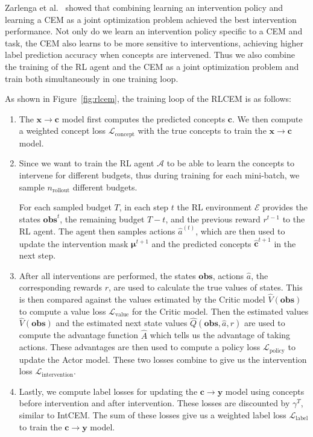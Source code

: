 Zarlenga et al.~\cite{intcem} showed that combining learning an intervention policy
and learning a CEM as a joint optimization problem achieved the best intervention performance.
Not only do we learn an intervention policy specific to a CEM and task, the 
CEM also learns to be more sensitive to interventions, achieving higher label prediction accuracy
when concepts are intervened. Thus we also combine the training of the RL agent and the CEM
as a joint optimization problem and train
both simultaneously in one training loop.

As shown in Figure~\ref{fig:rlcem}, the training loop
of the RLCEM is as follows:

\begin{enumerate}
    \item The $\mathbf{x} \to \mathbf{c}$ model first computes the predicted concepts $\mathbf{c}$.
    We then compute a weighted concept loss $\mathcal{L}_{\text{concept}}$ with the true concepts to train the $\mathbf{x} \to \mathbf{c}$ model.
    \item Since we want to train the RL agent $\mathcal{A}$ to be able to learn 
    the concepts to intervene for different budgets, thus during training 
    for each mini-batch, we sample $n_{\text{rollout}}$ different budgets.

    For each sampled budget $T$, 
    in each step $t$
    the RL environment $\mathcal{E}$ provides
    the states $\textbf{obs}^t$, the remaining budget $T - t$, 
    and the previous reward $r^{t-1}$ to the RL agent. The agent then samples actions
    $\hat{a}^{(t)}$, which are then used to update the intervention mask $\bm{\mu}^{t+1}$
    and the predicted concepts $\hat{\mathbf{c}}^{t+1}$ in the next step.

    \item After all interventions are performed, the states $\textbf{obs}$,
    actions $\hat{a}$,
    the corresponding rewards $r$, are used to calculate the true values of states.
    This is then compared against the values estimated by the Critic model
    $\hat{V}(\textbf{obs})$
    to compute a value loss $\mathcal{L}_{\text{value}}$ for the Critic model.
    Then the estimated values $\hat{V}(\textbf{obs})$ and the estimated 
    next state values $\hat{Q}(\textbf{obs}, \hat{a}, r)$
    are used to compute the advantage function $\hat{A}$ which tells us
    the advantage of taking actions. These advantages are then used to compute
    a policy loss $\mathcal{L}_{\text{policy}}$ to update the Actor model.
    These two losses combine to give us the intervention loss $\mathcal{L}_{\text{intervention}}$.
    \item Lastly, we compute label losses for 
    updating 
    the $\mathbf{c} \to \mathbf{y}$ model using concepts before intervention and after intervention. These losses are
    discounted by $\gamma^T$, similar to IntCEM. The sum of these losses give us a weighted label loss $\mathcal{L}_{\text{label}}$ to train the $\mathbf{c} \to \mathbf{y}$ model.
\end{enumerate}

